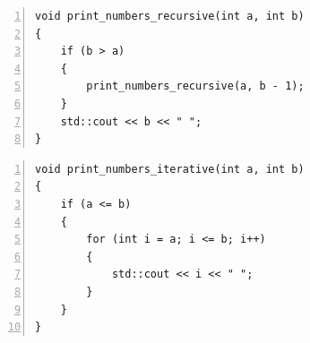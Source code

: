 \setcounter{lstlisting}{0}
\renewcommand{\thelstlisting}{А.\arabic{lstlisting}}

\begin{lstlisting}[label={lst:recursive}, caption={Рекурсивная функция вывода чисел в диапазоне от A до B}, numbers=left]
void print_numbers_recursive(int a, int b)
{
	if (b > a)
	{
		print_numbers_recursive(a, b - 1);
	}
	std::cout << b << " ";
}
\end{lstlisting}

\begin{lstlisting}[label={lst:iterative}, caption={Итеративная функция вывода чисел в диапазоне от A до B}, numbers=left]
void print_numbers_iterative(int a, int b)
{
	if (a <= b)
	{
		for (int i = a; i <= b; i++)
		{
			std::cout << i << " ";
		}
	}
}
\end{lstlisting}
